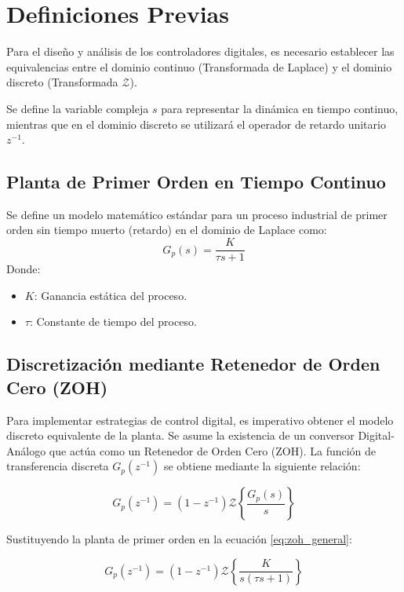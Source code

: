 \section{Definiciones Previas}

Para el diseño y análisis de los controladores digitales, es necesario establecer las equivalencias entre el dominio continuo (Transformada de Laplace) y el dominio discreto (Transformada $\mathcal{Z}$). 

Se define la variable compleja $s$ para representar la dinámica en tiempo continuo, mientras que en el dominio discreto se utilizará el operador de retardo unitario $z^{-1}$.

\subsection{Planta de Primer Orden en Tiempo Continuo}
Se define un modelo matemático estándar para un proceso industrial de primer orden sin tiempo muerto (retardo) en el dominio de Laplace como:
\begin{equation}
  G_p(s) = \frac{K}{\tau s + 1}
\end{equation}
Donde:
\begin{itemize}
    \item $K$: Ganancia estática del proceso.
    \item $\tau$: Constante de tiempo del proceso.
\end{itemize}

\subsection{Discretización mediante Retenedor de Orden Cero (ZOH)}
Para implementar estrategias de control digital, es imperativo obtener el modelo discreto equivalente de la planta. Se asume la existencia de un conversor Digital-Análogo que actúa como un Retenedor de Orden Cero (ZOH). La función de transferencia discreta $G_p(z^{-1})$ se obtiene mediante la siguiente relación:

\begin{equation} \label{eq:zoh_general}
  G_p(z^{-1}) = (1 - z^{-1}) \mathcal{Z} \left\{ \frac{G_p(s)}{s} \right\}
\end{equation}

Sustituyendo la planta de primer orden en la ecuación \ref{eq:zoh_general}:

\[
  G_p(z^{-1}) = (1 - z^{-1}) \mathcal{Z} \left\{ \frac{K}{s(\tau s + 1)} \right\}
\]

